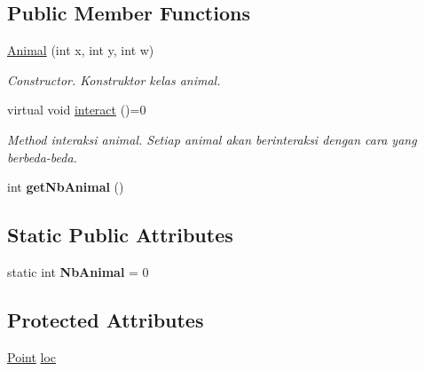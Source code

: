 \subsection*{Public Member Functions}
\begin{DoxyCompactItemize}
\item 
\hyperlink{classAnimal_a38f8dc7a0844d03658f0cd5de482a5db}{Animal} (int x, int y, int w)\hypertarget{classAnimal_a38f8dc7a0844d03658f0cd5de482a5db}{}\label{classAnimal_a38f8dc7a0844d03658f0cd5de482a5db}

\begin{DoxyCompactList}\small\item\em Constructor. Konstruktor kelas animal. \end{DoxyCompactList}\item 
virtual void \hyperlink{classAnimal_af47626b050b665e9a19525227d2b840f}{interact} ()=0\hypertarget{classAnimal_af47626b050b665e9a19525227d2b840f}{}\label{classAnimal_af47626b050b665e9a19525227d2b840f}

\begin{DoxyCompactList}\small\item\em Method interaksi animal. Setiap animal akan berinteraksi dengan cara yang berbeda-\/beda. \end{DoxyCompactList}\item 
int {\bfseries get\+Nb\+Animal} ()\hypertarget{classAnimal_a654785ec6e23f33780711446eff77c81}{}\label{classAnimal_a654785ec6e23f33780711446eff77c81}

\end{DoxyCompactItemize}
\subsection*{Static Public Attributes}
\begin{DoxyCompactItemize}
\item 
static int {\bfseries Nb\+Animal} = 0\hypertarget{classAnimal_a828b89505d3cf5fee0e3042332a81e6e}{}\label{classAnimal_a828b89505d3cf5fee0e3042332a81e6e}

\end{DoxyCompactItemize}
\subsection*{Protected Attributes}
\begin{DoxyCompactItemize}
\item 
\hyperlink{classPoint}{Point} \hyperlink{classAnimal_a7f26dd7aa22ec6c003e0d564fb27baa3}{loc}
\end{DoxyCompactItemize}


